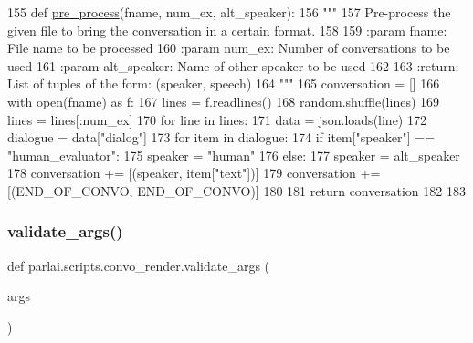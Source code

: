 \begin{DoxyCode}
155 \textcolor{keyword}{def }\hyperlink{namespaceparlai_1_1scripts_1_1convo__render_a0f0a031443ca797c936d2961a702a45e}{pre\_process}(fname, num\_ex, alt\_speaker):
156     \textcolor{stringliteral}{"""}
157 \textcolor{stringliteral}{    Pre-process the given file to bring the conversation in a certain format.}
158 \textcolor{stringliteral}{}
159 \textcolor{stringliteral}{    :param fname: File name to be processed}
160 \textcolor{stringliteral}{    :param num\_ex: Number of conversations to be used}
161 \textcolor{stringliteral}{    :param alt\_speaker: Name of other speaker to be used}
162 \textcolor{stringliteral}{}
163 \textcolor{stringliteral}{    :return: List of tuples of the form: (speaker, speech)}
164 \textcolor{stringliteral}{    """}
165     conversation = []
166     with open(fname) \textcolor{keyword}{as} f:
167         lines = f.readlines()
168         random.shuffle(lines)
169         lines = lines[:num\_ex]
170         \textcolor{keywordflow}{for} line \textcolor{keywordflow}{in} lines:
171             data = json.loads(line)
172             dialogue = data[\textcolor{stringliteral}{"dialog"}]
173             \textcolor{keywordflow}{for} item \textcolor{keywordflow}{in} dialogue:
174                 \textcolor{keywordflow}{if} item[\textcolor{stringliteral}{"speaker"}] == \textcolor{stringliteral}{"human\_evaluator"}:
175                     speaker = \textcolor{stringliteral}{"human"}
176                 \textcolor{keywordflow}{else}:
177                     speaker = alt\_speaker
178                 conversation += [(speaker, item[\textcolor{stringliteral}{"text"}])]
179             conversation += [(END\_OF\_CONVO, END\_OF\_CONVO)]
180 
181     \textcolor{keywordflow}{return} conversation
182 
183 
\end{DoxyCode}
\mbox{\label{namespaceparlai_1_1scripts_1_1convo__render_a4078a037f4f5526297e7860fbed9cfb2}} 
\subsubsection{\texorpdfstring{validate\+\_\+args()}{validate\_args()}}
{\footnotesize\ttfamily def parlai.\+scripts.\+convo\+\_\+render.\+validate\+\_\+args (\begin{DoxyParamCaption}\item[{}]{args }\end{DoxyParamCaption})}

